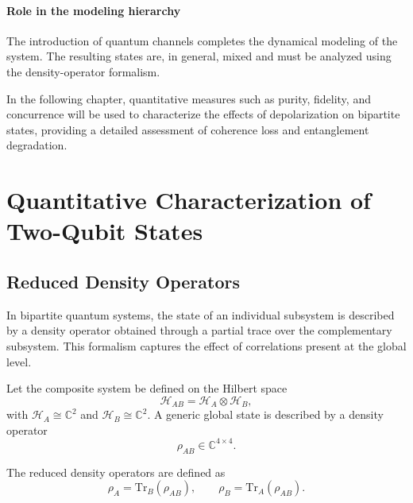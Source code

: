 \documentclass[a4paper]{article}
\begin{document}
\medskip

\paragraph{Role in the modeling hierarchy}

The introduction of quantum channels completes the dynamical modeling of the system. The resulting states are, in general, mixed and must be analyzed using the density-operator formalism.

In the following chapter, quantitative measures such as purity, fidelity, and concurrence will be used to characterize the effects of depolarization on bipartite states, providing a detailed assessment of coherence loss and entanglement degradation.



\section{Quantitative Characterization of Two-Qubit States}


\subsection{Reduced Density Operators}

In bipartite quantum systems, the state of an individual subsystem is described by a density operator obtained through a partial trace over the complementary subsystem. This formalism captures the effect of correlations present at the global level.

\medskip

Let the composite system be defined on the Hilbert space
\[
\mathcal{H}_{AB} = \mathcal{H}_A \otimes \mathcal{H}_B,
\]
with \( \mathcal{H}_A \cong \mathbb{C}^2 \) and \( \mathcal{H}_B \cong \mathbb{C}^2 \). A generic global state is described by a density operator
\[
\rho_{AB} \in \mathbb{C}^{4 \times 4}.
\]

The reduced density operators are defined as
\[
\rho_A = \mathrm{Tr}_B(\rho_{AB}), \qquad
\rho_B = \mathrm{Tr}_A(\rho_{AB}).
\]
\end{document}
